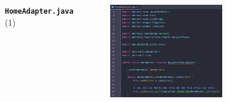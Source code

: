\documentclass{beamer}
\begin{document}
\begin{frame}
\begin{columns}
\begin{figure}
        \end{figure}
        \indent \textbf{\texttt{HomeAdapter.java}} (1)
        \begin{figure}
            \centering
            \includegraphics[width=\textwidth]{images/18.png}
        \end{figure}
    \end{columns}
\end{frame}
\end{document}
